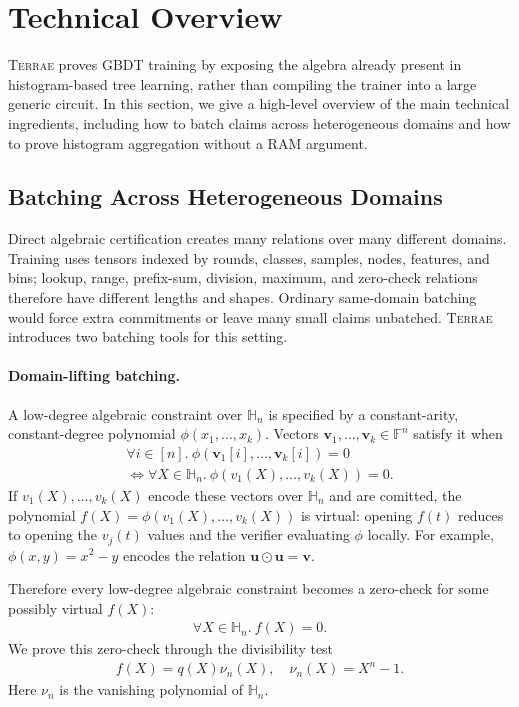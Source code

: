 \section{Technical Overview}
\label{sec:technical-overview}

\textsc{Terrae} proves GBDT training by exposing the algebra already present in
histogram-based tree learning, rather than compiling the trainer into a large
generic circuit. 
In this section, we give a high-level overview of the main technical ingredients,
including how to batch claims across heterogeneous domains and how to prove histogram aggregation without a RAM argument.


\subsection{Batching Across Heterogeneous Domains}\label{subsec:overview-batching}

Direct algebraic certification creates many relations over many different
domains. Training uses tensors indexed by rounds, classes, samples, nodes,
features, and bins; lookup, range, prefix-sum, division, maximum, and
zero-check relations therefore have different lengths and shapes. Ordinary
same-domain batching would force extra commitments or leave many small claims
unbatched. \textsc{Terrae} introduces two batching tools for this setting.

\paragraph{Domain-lifting batching.}
A low-degree algebraic constraint over $\mathbb{H}_n$ is specified by a
constant-arity, constant-degree polynomial $\phi(x_1,\ldots,x_k)$. Vectors
$\mathbf{v}_1,\ldots,\mathbf{v}_k\in\mathbb{F}^n$ satisfy it when
\begin{align}
    \forall i \in [n].\
    \phi(\mathbf{v}_1[i],\ldots,\mathbf{v}_k[i])=0\\
    \iff \forall X\in \mathbb{H}_n.\ \phi(v_1(X),\ldots,v_k(X))=0.
\end{align}
If $v_1(X),\ldots,v_k(X)$ encode these vectors over $\mathbb{H}_n$ and are comitted, the polynomial
$f(X)=\phi(v_1(X),\ldots,v_k(X))$ is virtual: opening $f(t)$ reduces to
opening the $v_j(t)$ values and 
the verifier evaluating $\phi$ locally. For example,
$\phi(x,y)=x^2-y$ encodes the relation
$\mathbf{u}\odot\mathbf{u}=\mathbf{v}$.

Therefore every low-degree algebraic
constraint becomes a zero-check
for some possibly virtual $f(X)$:
\begin{align}
    \forall X\in \mathbb{H}_n.\ f(X)=0.
\end{align}
We prove this zero-check through the divisibility test
\begin{align}
    f(X)=q(X)\nu_n(X),
    \quad
    \nu_n(X)=X^n-1.
\end{align}
Here $\nu_n$ is the vanishing polynomial of $\mathbb{H}_n$.

